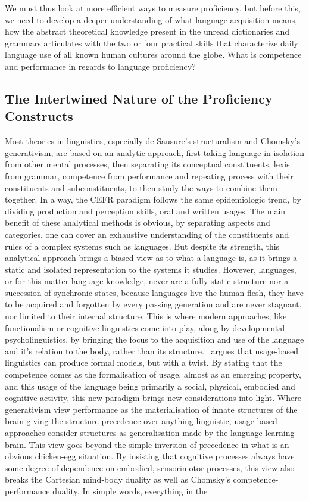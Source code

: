 We must thus look at more efficient ways to measure proficiency, but before this, we need to develop a deeper understanding of what language acquisition means, how the abstract theoretical knowledge present in the unread dictionaries and grammars articulates with the two or four practical skills that characterize daily language use of all known human cultures around the globe. What is competence and performance in regards to language proficiency?

    \subsection{The Intertwined Nature of the Proficiency Constructs}
Most theories in linguistics, especially de Sausure's structuralism and Chomsky's generativism, are based on an analytic approach, first taking language in isolation from other mental processes, then separating its conceptual constituents, lexis from grammar, competence from performance \parencite{chomsky_aspects_1965} and repeating process with their constituents and subconstituents, to then study the ways to combine them together. In a way, the CEFR paradigm follows the same epidemiologic trend, by dividing production and perception skills, oral and written usages. The main benefit of these analytical methods is obvious, by separating aspects and categories, one can cover an exhaustive understanding of the constituents and rules of a complex systems such as languages. But despite its strength, this analytical approach brings a biased view as to what a language is, as it brings a static and isolated representation to the systems it studies. However, languages, or for this matter language knowledge, never are a fully static structure nor a succession of synchronic states, because languages live the human flesh, they have to be acquired and forgotten by every passing generation and are never stagnant, nor limited to their internal structure. This is where modern approaches, like functionalism or cognitive linguistics \textcite{evans_cognitive_2009} come into play, along by developmental psycholinguistics, by bringing the focus to the acquisition and use of the language and it's relation to the body, rather than its structure.\ \textcite{bybee_usage-based_1999} argues that usage-based linguistics can produce formal models, but with a twist. By stating that the competence comes as the formalisation of usage, almost as an emerging property, and this usage of the language being primarily a social, physical, embodied and cognitive activity, this new paradigm brings new considerations into light. Where generativism view performance as the materialisation of innate structures of the brain giving the structure precedence over anything linguistic, usage-based approaches consider structures as generalisation made by the language learning brain. This view goes beyond the simple inversion of precedence in what is an obvious chicken-egg situation. By insisting that cognitive processes always have some degree of dependence on embodied, sensorimotor processes, this view also breaks the Cartesian mind-body duality \parencite{varela_embodied_1991} as well as Chomsky's competence-performance duality. In simple words, everything in the 